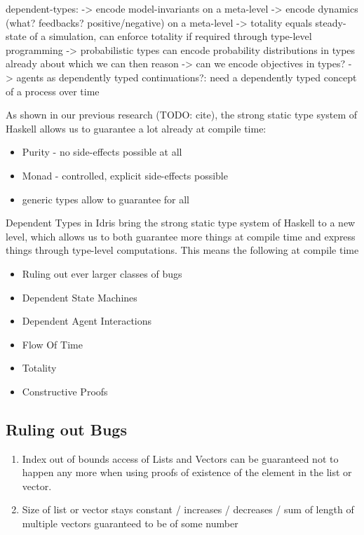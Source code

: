 dependent-types:
-> encode model-invariants on a meta-level
-> encode dynamics (what? feedbacks? positive/negative) on a meta-level
-> totality equals steady-state of a simulation, can enforce totality if required through type-level programming
-> probabilistic types can encode probability distributions in types already about which we can then reason
-> can we encode objectives in types?
-> agents as dependently typed continuations?: need a dependently typed concept of a process over time

As shown in our previous research (TODO: cite), the strong static type system of Haskell allows us to guarantee a lot already at compile time:
\begin{itemize}
	\item Purity - no side-effects possible at all 
	\item Monad - controlled, explicit side-effects possible
	\item generic types allow to guarantee for all
\end{itemize}

Dependent Types in Idris bring the strong static type system of Haskell to a new level, which allows us to both guarantee more things at compile time and express things through type-level computations. This means the following at compile time

\begin{itemize}
	\item Ruling out ever larger classes of bugs
	\item Dependent State Machines
	\item Dependent Agent Interactions
	\item Flow Of Time
	\item Totality
	\item Constructive Proofs
\end{itemize}

\subsection{Ruling out Bugs}
\begin{enumerate}
	\item Index out of bounds access of Lists and Vectors can be guaranteed not to happen any more when using proofs of existence of the element in the list or vector.
	\item Size of list or vector stays constant / increases / decreases / sum of length of multiple vectors guaranteed to be of some number
\end{enumerate}

